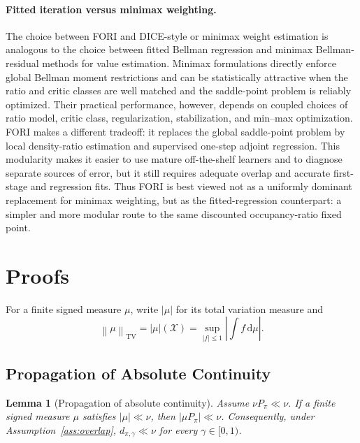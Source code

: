 \documentclass{article}
\newcommand{\sX}{\mathcal{X}}
\newcommand{\1}{\mathbf{1}}
\newcommand{\dd}{\mathrm{d}}
\newcommand{\Ppi}{P_\pi}
\newcommand{\abs}[1]{\left\lvert #1 \right\rvert}
\newcommand{\tvnorm}[1]{\left\lVert #1 \right\rVert_{\mathrm{TV}}}
\theoremstyle{plain}
\newtheorem{lemma}[theorem]{Lemma}
\theoremstyle{definition}
\theoremstyle{remark}
\begin{document}
\paragraph{Fitted iteration versus minimax weighting.}
The choice between \textsc{FORI} and DICE-style or minimax weight estimation is
analogous to the choice between fitted Bellman regression and minimax
Bellman-residual methods for value estimation. Minimax formulations directly
enforce global Bellman moment restrictions and can be statistically attractive
when the ratio and critic classes are well matched and the saddle-point problem
is reliably optimized. Their practical performance, however, depends on coupled
choices of ratio model, critic class, regularization, stabilization, and
min--max optimization. \textsc{FORI} makes a different tradeoff: it replaces the
global saddle-point problem by local density-ratio estimation and supervised
one-step adjoint regression. This modularity makes it easier to use mature
off-the-shelf learners and to diagnose separate sources of error, but it still
requires adequate overlap and accurate first-stage and regression fits. Thus
\textsc{FORI} is best viewed not as a uniformly dominant replacement for
minimax weighting, but as the fitted-regression counterpart: a simpler and more
modular route to the same discounted occupancy-ratio fixed point.





\appendix

\section{Proofs}
\label{app:proofs}

For a finite signed measure $\mu$, write $\abs{\mu}$ for its total variation measure and
\[
    \tvnorm{\mu}=\abs{\mu}(\sX)
    =
    \sup_{\abs{f}\leq 1}\abs{\int f\,\dd\mu}.
\]

\subsection{Propagation of Absolute Continuity}
\label{app:overlap}

\begin{lemma}[Propagation of absolute continuity]
\label{lem:ac-propagation}
Assume $\nu\Ppi\ll\nu$.
If a finite signed measure $\mu$ satisfies $\abs{\mu}\ll\nu$, then $\abs{\mu\Ppi}\ll\nu$.
Consequently, under Assumption~\ref{ass:overlap}, $d_{\pi,\gamma}\ll\nu$ for every $\gamma\in[0,1)$.
\end{lemma}
\end{document}
